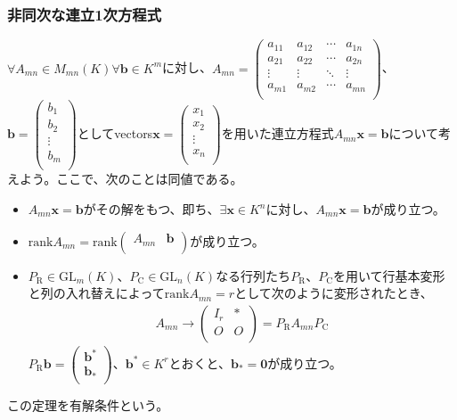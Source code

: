 \documentclass[dvipdfmx]{jsarticle}
\begin{document}
\subsubsection{非同次な連立1次方程式}%
\begin{thm}[有解条件]\label{2.1.8.5}
$\forall A_{mn} \in M_{mn}(K)\forall\mathbf{b} \in K^{m}$に対し、$A_{mn} = \begin{pmatrix}
a_{11} & a_{12} & \cdots & a_{1n} \\
a_{21} & a_{22} & \cdots & a_{2n} \\
 \vdots & \vdots & \ddots & \vdots \\
a_{m1} & a_{m2} & \cdots & a_{mn} \\
\end{pmatrix}$、$\mathbf{b} = \begin{pmatrix}
b_{1} \\
b_{2} \\
 \vdots \\
b_{m} \\
\end{pmatrix}$としてvectors$\mathbf{x} = \begin{pmatrix}
x_{1} \\
x_{2} \\
 \vdots \\
x_{n} \\
\end{pmatrix}$を用いた連立方程式$A_{mn}\mathbf{x} = \mathbf{b}$について考えよう。ここで、次のことは同値である。
\begin{itemize}
\item
  $A_{mn}\mathbf{x} = \mathbf{b}$がその解をもつ、即ち、$\exists\mathbf{x} \in K^{n}$に対し、$A_{mn}\mathbf{x} = \mathbf{b}$が成り立つ。
\item
  ${\mathrm{rank}}A_{mn} = {\mathrm{rank}}\begin{pmatrix}
  A_{mn} & \mathbf{b} \\
  \end{pmatrix}$が成り立つ。
\item
  $P_{\mathrm{R}} \in {\mathrm{GL}}_{m}(K)$、$P_{\mathrm{C}} \in {\mathrm{GL}}_{n}(K)$なる行列たち$P_{\mathrm{R}}$、$P_{\mathrm{C}}$を用いて行基本変形と列の入れ替えによって${\mathrm{rank}}A_{mn} = r$として次のように変形されたとき、
\begin{align*}
A_{mn} \rightarrow \begin{pmatrix}
I_{r} & * \\
O & O \\
\end{pmatrix} = P_{\mathrm{R}}A_{mn}P_{\mathrm{C}}
\end{align*}
$P_{\mathrm{R}}\mathbf{b} = \begin{pmatrix}
\mathbf{b}^{*} \\
\mathbf{b}_{*} \\
\end{pmatrix}$、$\mathbf{b}^{*} \in K^{r}$とおくと、$\mathbf{b}_{*} = \mathbf{0}$が成り立つ。
\end{itemize}
この定理を有解条件という。
\end{thm}
\end{document}
